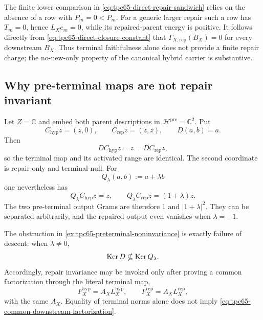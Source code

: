 \begin{remark}
\label{rem:tpc65-new-only-repair}
The finite lower comparison in
\eqref{eq:tpc65-direct-repair-sandwich} relies on the absence of a row
with \(P_m=0<\widetilde P_m\).  For a generic larger repair such a row has
\(T_m=0\), hence \(L_Xe_m=0\), while its repaired-parent energy is
positive.  It follows directly from
\eqref{eq:tpc65-direct-closure-constant} that
\(\Gamma_{X,\mathrm{rep}}(B_X)=0\) for every downstream \(B_X\).
Thus terminal faithfulness alone does not provide a finite repair charge;
the no-new-only property of the canonical hybrid carrier is substantive.
\end{remark}

\subsection{Why pre-terminal maps are not repair invariant}

\begin{example}
\label{ex:tpc65-preterminal-noninvariance}
Let \(Z=\mathbb C\) and embed both parent descriptions in
\(\mathcal H^{\mathrm{pre}}=\mathbb C^2\).  Put
\[
 C_{\mathrm{hyp}}z=(z,0),
 \qquad
 C_{\mathrm{rep}}z=(z,z),
 \qquad
 D(a,b)=a.
\]
Then
\[
 DC_{\mathrm{hyp}}z=z=DC_{\mathrm{rep}}z,
\]
so the terminal map and its activated range are identical.  The second
coordinate is repair-only and terminal-null.  For
\[
 Q_\lambda(a,b):=a+\lambda b
\]
one nevertheless has
\[
 Q_\lambda C_{\mathrm{hyp}}z=z,
 \qquad
 Q_\lambda C_{\mathrm{rep}}z=(1+\lambda)z.
\]
The two pre-terminal output Grams are therefore \(1\) and
\(|1+\lambda|^2\).  They can be separated arbitrarily, and the repaired
output even vanishes when \(\lambda=-1\).
\end{example}

The obstruction in \cref{ex:tpc65-preterminal-noninvariance} is exactly
failure of descent: when \(\lambda\ne0\),
\[
 \operatorname{Ker} D\nsubseteq\operatorname{Ker} Q_\lambda.
\]
Accordingly, repair invariance may be invoked only after proving a common
factorization through the literal terminal map,
\begin{equation}
 F_X^{\mathrm{hyp}}=A_XL_X^{\mathrm{hyp}},
 \qquad
 F_X^{\mathrm{rep}}=A_XL_X^{\mathrm{rep}},
 \label{eq:tpc65-common-downstream-factorization}
\end{equation}
with the same \(A_X\).  Equality of terminal norms alone does not imply
\eqref{eq:tpc65-common-downstream-factorization}.

